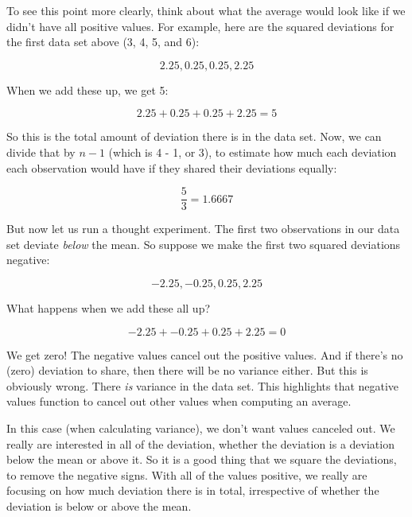 \documentclass[../../../main.tex]{subfiles}
\begin{document}
To see this point more clearly, think about what the average would look like if we didn't have all positive values. For example, here are the squared deviations for the first data set above (3, 4, 5, and 6):

\begin{equation*}
  2.25, 0.25, 0.25, 2.25
\end{equation*}

\noindent
When we add these up, we get 5:

\begin{equation*}
  2.25 + 0.25 + 0.25 + 2.25 = 5
\end{equation*}

\noindent
So this is the total amount of deviation there is in the data set. Now, we can divide that by $n - 1$ (which is 4 - 1, or 3), to estimate how much each deviation each observation would have if they shared their deviations equally:

\begin{equation*}
  \frac{5}{3} = 1.6667
\end{equation*}

\noindent
But now let us run a thought experiment. The first two observations in our data set deviate \emph{below} the mean. So suppose we make the first two squared deviations negative:

\begin{equation*}
  -2.25, -0.25, 0.25, 2.25
\end{equation*}

\noindent
What happens when we add these all up?

\begin{equation*}
  -2.25 + -0.25 + 0.25 + 2.25 = 0
\end{equation*}

\noindent
We get zero! The negative values cancel out the positive values. And if there's no (zero) deviation to share, then there will be no variance either. But this is obviously wrong. There \emph{is} variance in the data set. This highlights that negative values function to cancel out other values when computing an average. 

In this case (when calculating variance), we don't want values canceled out. We really are interested in all of the deviation, whether the deviation is a deviation below the mean or above it. So it is a good thing that we square the deviations, to remove the negative signs. With all of the values positive, we really are focusing on how much deviation there is in total, irrespective of whether the deviation is below or above the mean.
\end{document}

